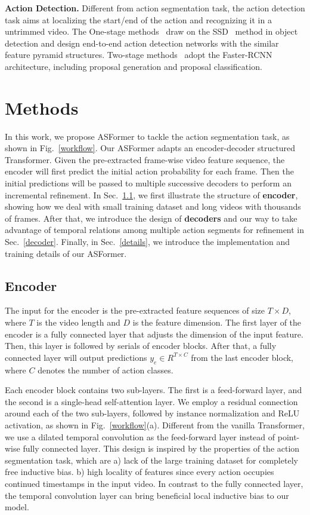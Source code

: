 \documentclass{bmvc2k}
\begin{document}
\noindent
\textbf{Action Detection.} Different from action segmentation task, the action detection task aims at localizing the start/end of the action and recognizing it in a untrimmed video. The One-stage methods~\cite{one_stage_action_det1,one_stage_action_det2} draw on the SSD~\cite{ssd} method in object detection and design end-to-end action detection networks with the similar feature pyramid structures. Two-stage methods~\cite{two_stage_action_det1,two_stage_action_det2} adopt the Faster-RCNN~\cite{faster_rcnn} architecture, including proposal generation and proposal classification. 



\section{Methods}
In this work, we propose ASFormer to tackle the action segmentation task, as shown in Fig.~\ref{workflow}. Our ASFormer adapts an encoder-decoder structured Transformer. Given the pre-extracted frame-wise video feature sequence, the encoder will first predict the initial action probability for each frame. Then the initial predictions will be passed to multiple successive decoders to perform an incremental refinement. In Sec.~\ref{encoder}, we first illustrate the structure of \textbf{encoder}, showing how we deal with small training dataset and long videos with thousands of frames. After that, we introduce the design of \textbf{decoders} and our way to take advantage of temporal relations among multiple action segments for refinement in Sec.~\ref{decoder}. Finally, in Sec.~\ref{details}, we introduce the implementation and training details of our ASFormer.


\subsection{Encoder}
\label{encoder}
The input for the encoder is the pre-extracted feature sequences of size $T \times D$, where $T$ is the video length and $D$ is the feature dimension. The first layer of the encoder is a fully connected layer that adjusts the dimension of the input feature. Then, this layer is followed by serials of encoder blocks. After that, a fully connected layer will output predictions $y_e \in {R}^{T \times C}$ from the last encoder block, where $C$ denotes the number of action classes.  

Each encoder block contains two sub-layers. The first is a feed-forward layer, and the second is a single-head self-attention layer. We employ a residual connection around each of the two sub-layers, followed by instance normalization and ReLU activation, as shown in Fig.~\ref{workflow}(a). Different from the vanilla Transformer, we use a dilated temporal convolution as the feed-forward layer instead of point-wise fully connected layer. This design is inspired by the properties of the action segmentation task, which are a) lack of the large training dataset for completely free inductive bias. b) high locality of features since every action occupies continued timestamps in the input video. In contrast to the fully connected layer, the temporal convolution layer can bring beneficial local inductive bias to our model.
\end{document}
